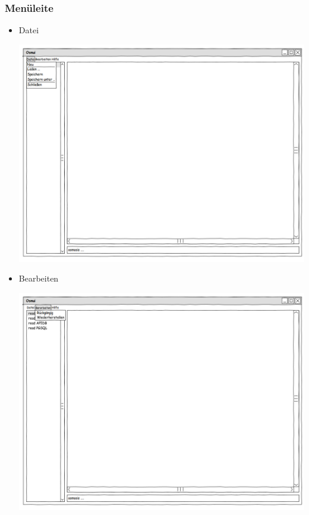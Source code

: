 \documentclass[a4paper,10pt]{scrartcl}
\begin{document}
\subsubsection{Menüleite}
\begin{itemize}
\item Datei\\
\begin{center}
\includegraphics[width=15cm]{ui_prototype/OsmUi_Datei.png}
\end{center}
\item Bearbeiten\\
\begin{center}
\includegraphics[width=15cm]{ui_prototype/OsmUi_Bearbeiten.png}

\end{center}
\end{itemize}
\end{document}
